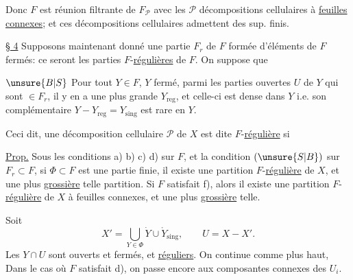 Donc $F$ est réunion filtrante de $F_{\mathcal P}$ avec les $\mathcal P$ décompositions cellulaires à \uline{feuilles connexes}; et ces décompositions cellulaires admettent des sup. finis.

\uline{§ 4} 
Supposons maintenant donné une partie $F_r$ de $F$  formée d'éléments de $F$  fermés: ce seront les parties $F$-\uline{régulières} de $F$. On suppose que

\textcircled{$\unsure{B|S}$} Pour tout $Y\in F$, $Y$  fermé, parmi les parties  ouvertes $U$ de $Y$ qui sont $\in F_r$, il y en a une plus grande $Y_{\mathrm{reg}}$, et  celle-ci est dense dans $Y$ i.e. son complémentaire $Y-Y_{\mathrm{reg}}=Y_{\mathrm{sing}}$ est rare en $Y$.

Ceci dit, une décomposition cellulaire $\mathcal P$ de $X$ est dite $F$-\uline{régulière} si 

\uline{Prop.} Sous les conditions a) b) c) d)   sur $F$, et la condition $(\unsure{S|B})$ sur $F_r\subset F$, si $\Phi\subset F$ est une partie finie, il existe une partition $F$-\uline{régulière} de $X$, et \unsure{$=$|---} une plus \uline{grossière} telle partition. Si $F$ satisfait \unsure{$=$|---} f), alors il existe une partition $F$-\uline{régulière} de $X$ à feuilles connexes, et une plus \uline{grossière} telle.

Soit
\[
X'=\bigcup_{Y\in\Phi}\dot Y\cup\mathring Y_{\mathrm{sing}},\qquad U=X-X'.
\]
Les $Y\cap U$ sont ouverts et fermés, et \uline{réguliers}. On continue comme plus haut,  Dans le cas où $F$ satisfait d), on passe encore  aux composantes connexes des $U_i$.

